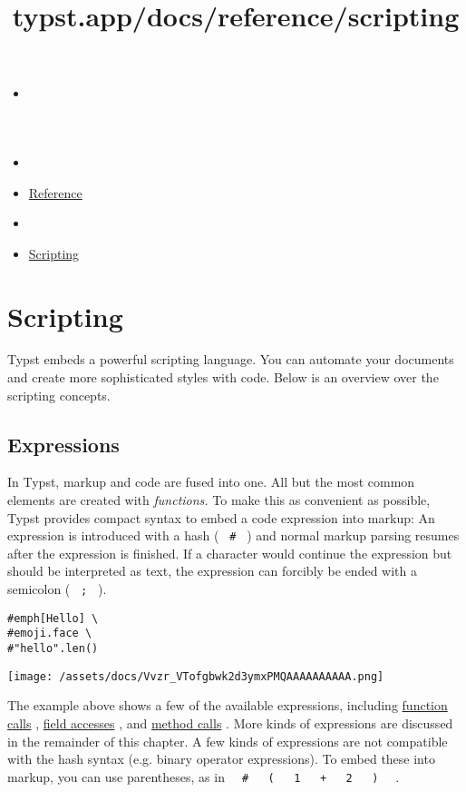 \title{typst.app/docs/reference/scripting}

\begin{itemize}
\tightlist
\item
  \href{/docs}{}
\item
  
\item
  \href{/docs/reference/}{Reference}
\item
  
\item
  \href{/docs/reference/scripting/}{Scripting}
\end{itemize}

\section{Scripting}\label{scripting}

Typst embeds a powerful scripting language. You can automate your
documents and create more sophisticated styles with code. Below is an
overview over the scripting concepts.

\subsection{Expressions}\label{expressions}

In Typst, markup and code are fused into one. All but the most common
elements are created with \emph{functions.} To make this as convenient
as possible, Typst provides compact syntax to embed a code expression
into markup: An expression is introduced with a hash ( \texttt{\ \#\ } )
and normal markup parsing resumes after the expression is finished. If a
character would continue the expression but should be interpreted as
text, the expression can forcibly be ended with a semicolon (
\texttt{\ ;\ } ).

\begin{verbatim}
#emph[Hello] \
#emoji.face \
#"hello".len()
\end{verbatim}

\texttt{[image: /assets/docs/Vvzr\_VTofgbwk2d3ymxPMQAAAAAAAAAA.png]}

The example above shows a few of the available expressions, including
\href{/docs/reference/foundations/function/}{function calls} ,
\href{/docs/reference/scripting/\#fields}{field accesses} , and
\href{/docs/reference/scripting/\#methods}{method calls} . More kinds of
expressions are discussed in the remainder of this chapter. A few kinds
of expressions are not compatible with the hash syntax (e.g. binary
operator expressions). To embed these into markup, you can use
parentheses, as in
\texttt{\ }{\texttt{\ \#\ }}\texttt{\ }{\texttt{\ (\ }}\texttt{\ }{\texttt{\ 1\ }}\texttt{\ }{\texttt{\ +\ }}\texttt{\ }{\texttt{\ 2\ }}\texttt{\ }{\texttt{\ )\ }}\texttt{\ }
.


